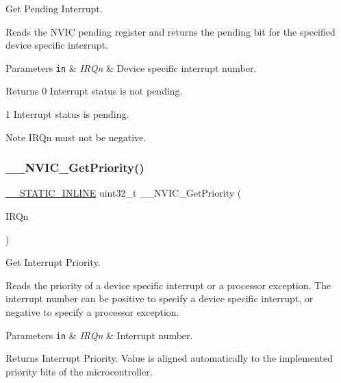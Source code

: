 Get Pending Interrupt. 

Reads the N\+V\+IC pending register and returns the pending bit for the specified device specific interrupt. 
\begin{DoxyParams}[1]{Parameters}
\mbox{\tt in}  & {\em I\+R\+Qn} & Device specific interrupt number. \\
\hline
\end{DoxyParams}
\begin{DoxyReturn}{Returns}
0 Interrupt status is not pending. 

1 Interrupt status is pending. 
\end{DoxyReturn}
\begin{DoxyNote}{Note}
I\+R\+Qn must not be negative. 
\end{DoxyNote}
\mbox{\label{group___c_m_s_i_s___core___n_v_i_c_functions_gaeb9dc99c8e7700668813144261b0bc73}} 
\subsubsection{\texorpdfstring{\+\_\+\+\_\+\+N\+V\+I\+C\+\_\+\+Get\+Priority()}{\_\_NVIC\_GetPriority()}}
{\footnotesize\ttfamily \mbox{\hyperlink{cmsis__iccarm_8h_aba87361bfad2ae52cfe2f40c1a1dbf9c}{\+\_\+\+\_\+\+S\+T\+A\+T\+I\+C\+\_\+\+I\+N\+L\+I\+NE}} uint32\+\_\+t \+\_\+\+\_\+\+N\+V\+I\+C\+\_\+\+Get\+Priority (\begin{DoxyParamCaption}\item[{\mbox{\hyperlink{group___interrupt__vector__numbers_gac3af4a32370fb28c4ade8bf2add80251}{I\+R\+Qn\+\_\+\+Type}}}]{I\+R\+Qn }\end{DoxyParamCaption})}



Get Interrupt Priority. 

Reads the priority of a device specific interrupt or a processor exception. The interrupt number can be positive to specify a device specific interrupt, or negative to specify a processor exception. 
\begin{DoxyParams}[1]{Parameters}
\mbox{\tt in}  & {\em I\+R\+Qn} & Interrupt number. \\
\hline
\end{DoxyParams}
\begin{DoxyReturn}{Returns}
Interrupt Priority. Value is aligned automatically to the implemented priority bits of the microcontroller. 
\end{DoxyReturn}
\mbox{\label{group___c_m_s_i_s___core___n_v_i_c_functions_ga9b894af672df4373eb637f8288845c05}} 
